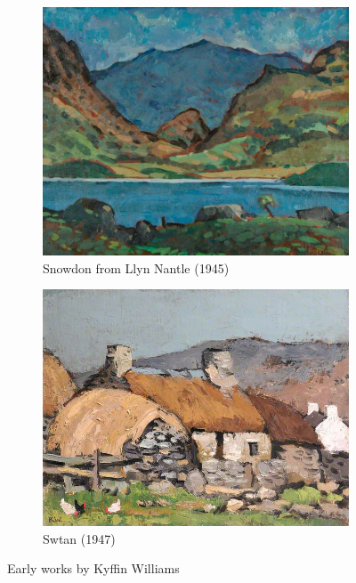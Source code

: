 \documentclass[11pt,fleqn,twoside]{article}
\begin{document}
\begin{figure}[h]
\centering
\begin{subfigure}[b]{0.4\textwidth}
  \centering
  \includegraphics[width=\textwidth]{img/acnmw_acnmw_da006778_02_large.jpg}
  \caption{Snowdon from Llyn Nantle (1945)}
\end{subfigure}
\begin{subfigure}[b]{0.4\textwidth}
  \centering
  \includegraphics[width=\textwidth]{img/nwm_oym_1_90_624x544.jpg}
  \caption{Swtan (1947)}
\end{subfigure}
\caption{Early works by Kyffin Williams}
\label{fig:kyffin-early}
\end{figure}
\end{document}
